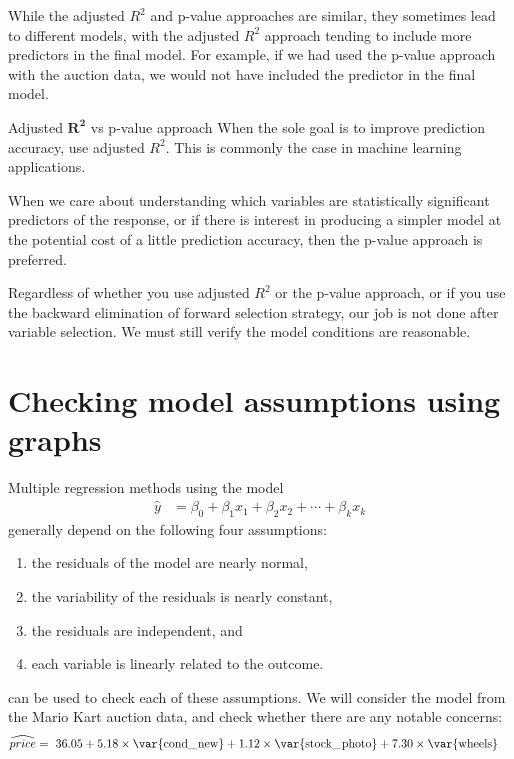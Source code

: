 While the adjusted $R^2$ and p-value approaches are similar, they sometimes lead to different models, with the adjusted $R^2$ approach tending to include more predictors in the final model. For example, if we had used the p-value approach with the auction data, we would not have included the  predictor in the final model.

\begin{onebox}{Adjusted $\mathbf{R^2}$ vs p-value approach}
When the sole goal is to improve prediction accuracy, use adjusted $R^2$. This is commonly the case in machine learning applications.\vspace{3mm}

When we care about understanding which variables are statistically significant predictors of the response, or if there is interest in producing a simpler model at the potential cost of a little prediction accuracy, then the p-value approach is preferred.
\end{onebox}

Regardless of whether you use adjusted $R^2$ or the p-value approach, or if you use the backward elimination of forward selection strategy, our job is not done after variable selection. We must still verify the model conditions are reasonable.




\section{Checking model assumptions using graphs}
\label{multipleRegressionModelAssumptions}


Multiple regression methods using the model
\begin{align*}
\hat{y} &= \beta_0 + \beta_1x_1 + \beta_2x_2 + \cdots + \beta_kx_k
\end{align*}
generally depend on the following four assumptions:
\begin{enumerate}
\setlength{\itemsep}{0mm}
\item the residuals of the model are nearly normal,
\item the variability of the residuals is nearly constant,
\item the residuals are independent, and
\item each variable is linearly related to the outcome.
\end{enumerate}
 can be used to check each of these assumptions. We will consider the model from the Mario Kart auction data, and check whether there are any notable concerns:
\begin{align*}
\widehat{price} &= \ 36.05 + 5.18 \times \text{\var{cond\_\hspace{0.3mm}new}} + 1.12 \times \text{\var{stock\_\hspace{0.3mm}photo}} + 7.30 \times \text{\var{wheels}}
\end{align*}

